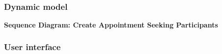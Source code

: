 \subsubsection{Dynamic model}
	\textbf{Sequence Diagram: Create Appointment Seeking Participants} \\
\subsubsection{User interface}